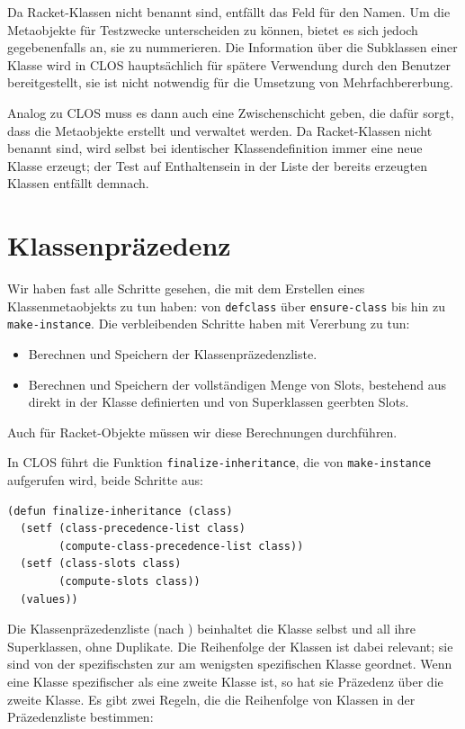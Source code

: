 Da Racket-Klassen nicht benannt sind, entfällt das Feld für den Namen. Um die Metaobjekte für Testzwecke unterscheiden zu können, bietet es sich jedoch gegebenenfalls an, sie zu nummerieren. Die Information über die Subklassen einer Klasse wird in CLOS hauptsächlich für spätere Verwendung durch den Benutzer bereitgestellt, sie ist nicht notwendig für die Umsetzung von Mehrfachbererbung. 

Analog zu CLOS muss es dann auch eine Zwischenschicht geben, die dafür sorgt, dass die Metaobjekte erstellt und verwaltet werden. Da Racket-Klassen nicht benannt sind, wird selbst bei identischer Klassendefinition immer eine neue Klasse erzeugt; der Test auf Enthaltensein in der Liste der bereits erzeugten Klassen entfällt demnach.

\section{Klassenpräzedenz}
\label{cpl}
Wir haben fast alle Schritte gesehen, die mit dem Erstellen eines Klassenmetaobjekts zu tun haben: von \texttt{defclass} über \texttt{ensure-class} bis hin zu \texttt{make-instance}. Die verbleibenden Schritte haben mit Vererbung zu tun:
\begin{itemize}
 \item Berechnen und Speichern der Klassenpräzedenzliste.
 \item Berechnen und Speichern der vollständigen Menge von Slots, bestehend aus direkt in der Klasse definierten und von Superklassen geerbten Slots.
\end{itemize}

Auch für Racket-Objekte müssen wir diese Berechnungen durchführen.

In CLOS führt die Funktion \texttt{finalize-inheritance}, die von \texttt{make-instance} aufgerufen wird, beide Schritte aus:

\begin{lstlisting}
(defun finalize-inheritance (class)
  (setf (class-precedence-list class)
        (compute-class-precedence-list class))
  (setf (class-slots class)
        (compute-slots class))
  (values))
\end{lstlisting}

Die Klassenpräzedenzliste (nach \cite[S. 118ff]{keene}) beinhaltet die Klasse selbst und all ihre Superklassen, ohne Duplikate. Die Reihenfolge der Klassen ist dabei relevant; sie sind von der spezifischsten zur am wenigsten spezifischen Klasse geordnet. Wenn eine Klasse spezifischer als eine zweite Klasse ist, so hat sie Präzedenz über die zweite Klasse. Es gibt zwei Regeln, die die Reihenfolge von Klassen in der Präzedenzliste bestimmen:

